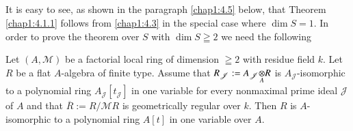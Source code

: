 \subsection{}\label{chap1:4.4}
It is easy to see, as shown in the paragraph \ref{chap1:4.5} below, that
Theorem \ref{chap1:4.1.1} follows from \ref{chap1:4.3} in the special case
where $\dim S=1$. In order to prove the theorem over $S$ with $\dim
S\geqq 2$ we need the following 

\begin{lemma*}
Let $(A,\mathscr{M})$ be a factorial local ring of dimension $\geqq 2$
with residue field $k$. Let $R$ be a flat $A$-algebra of finite
type. Assume that $R_{\mathscr{J}}:=\foprod{A_{\mathscr{J}}}{R}{A}$ is
$A_{\mathscr{J}}$-isomorphic to a polynomial ring
$A_{\mathscr{J}}[t_{\mathscr{J}}]$ in one variable for every
nonmaximal prime ideal $\mathscr{J}$ of $A$ and that
$\overline{R}:=R/\mathscr{M}R$ is geometrically regular over $k$. Then
$R$ is $A$-isomorphic to a polynomial ring $A[t]$ in one variable over $A$.
\end{lemma*}

